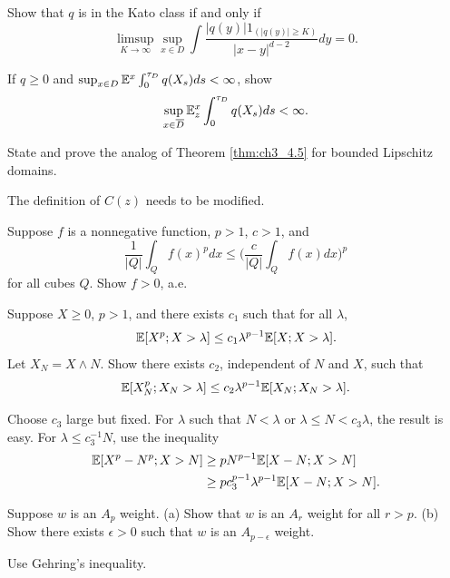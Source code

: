 \begin{exercise}\label{ex:ch3_15}
Show that $q$ is in the Kato class if and only if
\[
    \limsup_{K \to \infty} \sup_{x \in D} \int \frac{|q(y)|1_{(|q(y)| \geq K)}}{|x-y|^{d-2}}dy = 0.
\]
\end{exercise}

\begin{exercise}\label{ex:ch3_16}
If $q \geq 0$ and $\sup_{x \in D} \mathbb{E}^x \int_0^{\tau_D} q(X_s)ds < \infty$, show
\[
    \sup_{x \in \overline{D}} \mathbb{E}_z^x \int_0^{\tau_D} q(X_s)ds < \infty.
\]
\end{exercise}

\begin{exercise}\label{ex:ch3_17}
State and prove the analog of Theorem \ref{thm:ch3_4.5} for bounded Lipschitz domains.

\hint The definition of $C(z)$ needs to be modified.
\end{exercise}

\begin{exercise}\label{ex:ch3_18}
Suppose $f$ is a nonnegative function, $p > 1$, $c > 1$, and
\[
    \frac{1}{|Q|} \int_Q f(x)^p dx \leq \Big(\frac{c}{|Q|} \int_Q f(x)dx\Big)^p
\]
for all cubes $Q$. Show $f > 0$, a.e.
\end{exercise}

\begin{exercise}\label{ex:ch3_19}
Suppose $X \geq 0$, $p > 1$, and there exists $c_1$ such that for all $\lambda$,
\[
    \mathbb{E}[X^p; X > \lambda] \leq c_1\lambda^{p-1}\mathbb{E}[X; X > \lambda].
\]
Let $X_N = X \wedge N$. Show there exists $c_2$, independent of $N$ and $X$, such that
\mpagebreak
\[
    \mathbb{E}[X_N^p; X_N > \lambda] \leq c_2\lambda^{p-1}\mathbb{E}[X_N; X_N > \lambda].
\]

\hint Choose $c_3$ large but fixed. For $\lambda$ such that $N < \lambda$ or $\lambda \leq N < c_3\lambda$, the result is easy. For $\lambda \leq c_3^{-1}N$, use the inequality
\begin{align*}
    \mathbb{E}[X^p - N^p; X > N] &\geq pN^{p-1}\mathbb{E}[X - N; X > N] \\
    &\geq pc_3^{p-1}\lambda^{p-1}\mathbb{E}[X - N; X > N].
\end{align*}
\end{exercise}

\begin{exercise}\label{ex:ch3_20}
Suppose $w$ is an $A_p$ weight. (a) Show that $w$ is an $A_r$ weight for all $r > p$. (b) Show there exists $\epsilon > 0$ such that $w$ is an $A_{p-\epsilon}$ weight.

\hint Use Gehring's inequality.
\end{exercise}

